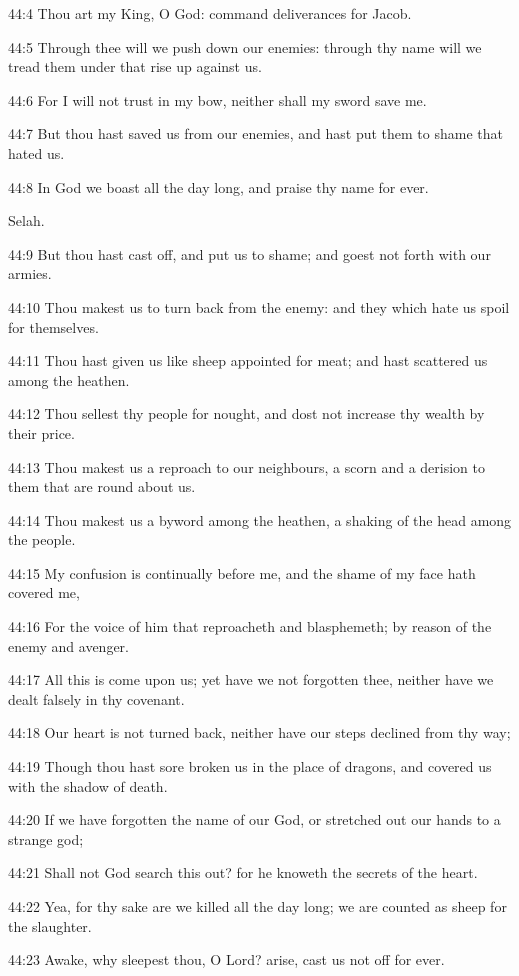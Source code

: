 44:4 Thou art my King, O God: command deliverances for Jacob.

44:5 Through thee will we push down our enemies: through thy name will
we tread them under that rise up against us.

44:6 For I will not trust in my bow, neither shall my sword save me.

44:7 But thou hast saved us from our enemies, and hast put them to
shame that hated us.

44:8 In God we boast all the day long, and praise thy name for ever.

Selah.

44:9 But thou hast cast off, and put us to shame; and goest not forth
with our armies.

44:10 Thou makest us to turn back from the enemy: and they which hate
us spoil for themselves.

44:11 Thou hast given us like sheep appointed for meat; and hast
scattered us among the heathen.

44:12 Thou sellest thy people for nought, and dost not increase thy
wealth by their price.

44:13 Thou makest us a reproach to our neighbours, a scorn and a
derision to them that are round about us.

44:14 Thou makest us a byword among the heathen, a shaking of the head
among the people.

44:15 My confusion is continually before me, and the shame of my face
hath covered me,

44:16 For the voice of him that reproacheth and blasphemeth; by reason
of the enemy and avenger.

44:17 All this is come upon us; yet have we not forgotten thee,
neither have we dealt falsely in thy covenant.

44:18 Our heart is not turned back, neither have our steps declined
from thy way;

44:19 Though thou hast sore broken us in the place of dragons, and
covered us with the shadow of death.

44:20 If we have forgotten the name of our God, or stretched out our
hands to a strange god;

44:21 Shall not God search this out? for he knoweth the secrets of the
heart.

44:22 Yea, for thy sake are we killed all the day long; we are counted
as sheep for the slaughter.

44:23 Awake, why sleepest thou, O Lord? arise, cast us not off for
ever.

